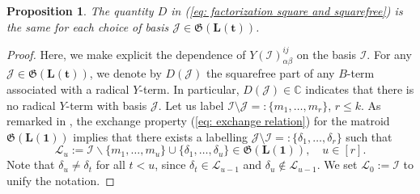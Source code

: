 \documentclass[10pt]{article}
\newtheorem{prop}{Proposition}%
\theoremstyle{remark}%
\theoremstyle{definition}%
\begin{document}
\begin{prop}
\label{prop: same radical for all starting sets} The quantity $D$
in (\ref{eq: factorization square and squarefree}) is the same for each choice of basis $\mathcal{J}\in\mathfrak{G}(\mathbf{L}(\mathbf{t}))$. 
\end{prop}
\begin{proof}
Here, we make explicit the dependence of $Y(\mathcal{I})_{\alpha\beta}^{ij}$
on the basis $\mathcal{I}$. For any $\mathcal{J}\in\mathfrak{G}(\mathbf{L}(\mathbf{t}))$, we denote by $D(\mathcal{J})$ the squarefree part of any $B$-term associated with a radical $Y$-term.
In particular, $D(\mathcal{J})\in\mathbb{C}$ indicates that there is no radical $Y$-term with basis $\mathcal{J}$. Let us label $\mathcal{I}\setminus\mathcal{J}=:\{m_{1},\dots,m_{r}\}$, $r\leq k$. As remarked in \cite[Lem.6]{Angelelli2019}, the exchange property (\ref{eq: exchange relation}) for the matroid $\mathfrak{G}(\mathbf{L}(\mathbf{1}))$ implies that there exists a labelling $\mathcal{J}\setminus\mathcal{I}=:\{\delta_{1},\dots,\delta_{r}\}$ such that 
 \begin{equation}
\mathcal{L}_{u}:=\mathcal{I}\backslash\{m_{1},\dots,m_{u}\}\cup\{\delta_{1},\dots,\delta_{u}\}\in\mathfrak{G}(\mathbf{L}(\mathbf{1})),\quad u\in[r].
\label{eq: chain of non-vanishing}
 \end{equation}
Note that $\delta_{u}\neq\delta_{t}$ for all $t<u$, since $\delta_{t}\in\mathcal{L}_{u-1}$ and $\delta_{u}\notin\mathcal{L}_{u-1}$. We set $\mathcal{L}_{0}:=\mathcal{I}$ to unify the notation. 


\end{proof}
\end{document}
